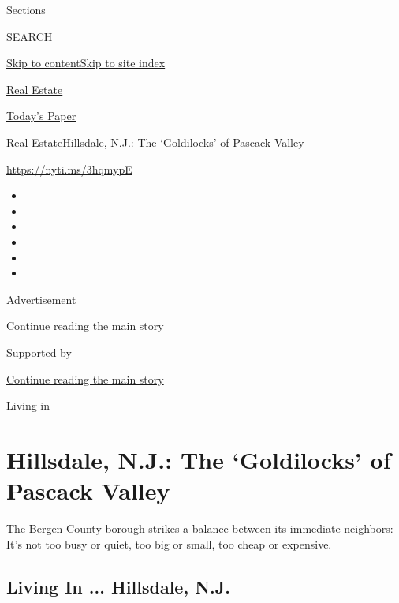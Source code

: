 Sections

SEARCH

\protect\hyperlink{site-content}{Skip to
content}\protect\hyperlink{site-index}{Skip to site index}

\href{https://www.nytimes.com/section/realestate}{Real Estate}

\href{https://myaccount.nytimes.com/auth/login?response_type=cookie\&client_id=vi}{}

\href{https://www.nytimes.com/section/todayspaper}{Today's Paper}

\href{/section/realestate}{Real Estate}\textbar{}Hillsdale, N.J.: The
`Goldilocks' of Pascack Valley

\url{https://nyti.ms/3hqmypE}

\begin{itemize}
\item
\item
\item
\item
\item
\item
\end{itemize}

Advertisement

\protect\hyperlink{after-top}{Continue reading the main story}

Supported by

\protect\hyperlink{after-sponsor}{Continue reading the main story}

Living in

\hypertarget{hillsdale-nj-the-goldilocks-of-pascack-valley}{%
\section{Hillsdale, N.J.: The `Goldilocks' of Pascack
Valley}\label{hillsdale-nj-the-goldilocks-of-pascack-valley}}

The Bergen County borough strikes a balance between its immediate
neighbors: It's not too busy or quiet, too big or small, too cheap or
expensive.

\href{https://www.nytimes.com/slideshow/2020/07/22/realestate/living-in-hillsdale-nj.html}{}

\hypertarget{living-in--hillsdale-nj}{%
\subsection{Living In ... Hillsdale,
N.J.}\label{living-in--hillsdale-nj}}

